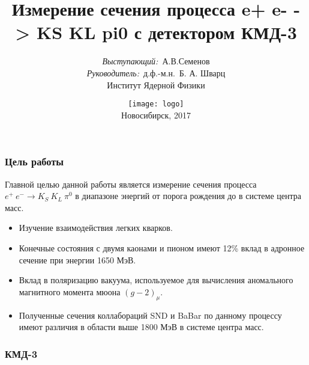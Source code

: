 \documentclass[14pt, hyperref = {colorlinks}]{beamer}
\title{\small{Измерение сечения процесса e+ e- -> KS KL pi0 с детектором КМД-3}}
\author{\small{%
\emph{Выступающий:}~А.В.Семенов\\%
\emph{Руководитель:}~д.ф.-м.н.~Б. А. Шварц}\\%
\vspace{30pt}%
Институт Ядерной Физики
\vspace{0pt}%
}
\date{\texttt{[image: logo]} \\
\vspace{20pt}%
\small{Новосибирск, 2017}}
\begin{document}
\maketitle

\small
\begin{frame}
\frametitle{Цель работы}\label{t1}
\begin{center}
 Главной целью данной работы является измерение сечения процесса {$e^+\:e^- \to K_{S}\:K_{L}\:\pi^0$} в диапазоне энергий от порога рождения  до  в системе центра масс.
\begin{itemize}
  \item Изучение взаимодействия легких кварков.
  \item Конечные состояния с двумя каонами и пионом имеют 12\% вклад в адронное сечение при энергии 1650 МэВ.
  \item Вклад в поляризацию вакуума, используемое для вычисления аномального магнитного момента мюона {$(g-2)_\mu$}.
  \item Полученные сечения коллабораций SND и BaBar по данному процессу имеют различия в области выше 1800 МэВ в системе центра масс.
\end{itemize}
\end{center}
\end{frame}


\begin{frame}
\frametitle{КМД-3}
\begin{figure}[h]
\hfill
\end{figure}
\end{frame}
\end{document}
